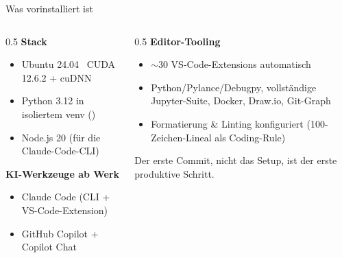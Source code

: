 \documentclass[aspectratio=169,11pt]{beamer}
\begin{document}
\begin{frame}{Was vorinstalliert ist}
  \begin{columns}[T]
    \begin{column}{0.5\textwidth}
      \textbf{Stack}
      \begin{itemize}
        \item Ubuntu 24.04 \textperiodcentered\ CUDA 12.6.2 + cuDNN
        \item Python 3.12 in isoliertem venv ()
        \item Node.js 20 (für die Claude-Code-CLI)
      \end{itemize}
      \vspace{0.3em}
      \textbf{KI-Werkzeuge ab Werk}
      \begin{itemize}
        \item Claude Code (CLI + VS-Code-Extension)
        \item GitHub Copilot + Copilot Chat
      \end{itemize}
    \end{column}
    \begin{column}{0.5\textwidth}
      \textbf{Editor-Tooling}
      \begin{itemize}
        \item $\sim$30 VS-Code-Extensions automatisch
        \item Python/Pylance/Debugpy, vollständige
              Jupyter-Suite, Docker, Draw.io, Git-Graph
        \item Formatierung \& Linting konfiguriert
              (100-Zeichen-Lineal als Coding-Rule)
      \end{itemize}
      \vspace{0.3em}
      \begin{takeaway}[Ziel]
        Der erste Commit, nicht das Setup, ist der erste produktive Schritt.
      \end{takeaway}
    \end{column}
  \end{columns}
\end{frame}

\end{document}

